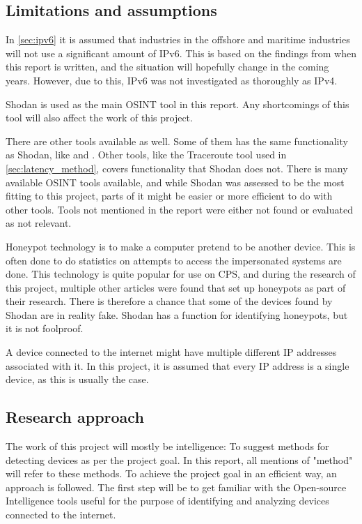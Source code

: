 \subsection{Limitations and assumptions} \label{sec:limits}
In \cref{sec:ipv6} it is assumed that industries in the offshore and maritime industries will not use a significant amount of IPv6. This is based on the findings from when this report is written, and the situation will hopefully change in the coming years. However, due to this, IPv6 was not investigated as thoroughly as IPv4.

Shodan is used as the main OSINT tool in this report. Any shortcomings of this tool will also affect the work of this project.

There are other tools available as well. Some of them has the same functionality as Shodan, like \href{https://censys.io/}{\color{blue}{Censys}}\cite{censys} and \href{www.zoomeye.org}{\color{blue}{ZoomEye}}\cite{zoomeye}. Other tools, like the Traceroute tool used in \cref{sec:latency_method}, covers functionality that Shodan does not. There is many available OSINT tools available, and while Shodan was assessed to be the most fitting to this project, parts of it might be easier or more efficient to do with other tools. Tools not mentioned in the report were either not found or evaluated as not relevant.

Honeypot technology is to make a computer pretend to be another device. This is often done to do statistics on attempts to access the impersonated systems are done. This technology is quite popular for use on CPS, and during the research of this project, multiple other articles were found that set up honeypots as part of their research.\cite{bodenheim_butts_dunlap_mullins_2014}\cite{ICS_shodan_article} There is therefore a chance that some of the devices found by Shodan are in reality fake. Shodan has a function for identifying honeypots, but it is not foolproof.

A device connected to the internet might have multiple different IP addresses associated with it. In this project, it is assumed that every IP address is a single device, as this is usually the case.


\subsection{Research approach} \label{sec:research_approach}
The work of this project will mostly be intelligence: To suggest methods for detecting devices as per the project goal. In this report, all mentions of "method" will refer to these methods.
To achieve the project goal in an efficient way, an approach is followed.
The first step will be to get familiar with the Open-source Intelligence tools useful for the purpose of identifying and analyzing devices connected to the internet. 

